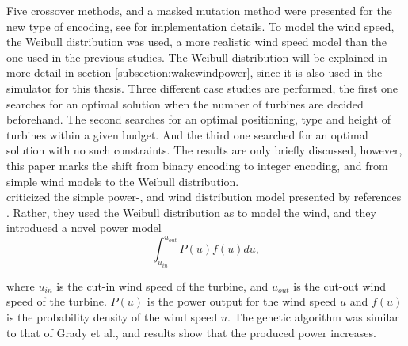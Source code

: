 \noindent Five crossover methods, and a masked mutation method were presented for the new type of encoding, see \cite{Mora} for implementation details. To model the wind speed, the Weibull distribution was used, a more realistic wind speed model than the one used in the previous studies. The Weibull distribution will be explained in more detail in section \ref{subsection:wakewindpower}, since it is also used in the simulator for this thesis. Three different case studies are performed, the first one searches for an optimal solution when the number of turbines are decided beforehand. The second searches for an optimal positioning, type and height of turbines within a given budget. And the third one searched for an optimal solution with no such constraints. The results are only briefly discussed, however, this paper marks the shift from binary encoding to integer encoding, and from simple wind models to the Weibull distribution.\\


\noindent \cite{Wan} criticized the simple power-, and wind distribution model presented by references \citep{Mosetti, Grady}. Rather, they used the Weibull distribution as \citep{Mora} to model the wind, and they introduced a novel power model \\


\begin{equation}
\label{Power Model (Wan)}
\int_{u_{in}}^{u_{out}} P(u)f(u) du,
\end{equation}


\noindent where $u_{in}$ is the cut-in wind speed of the turbine, and $u_{out}$ is the cut-out wind speed of the turbine. $P(u)$ is the power output for the wind speed $u$ and $f(u)$ is the probability density of the wind speed $u$. The genetic algorithm was similar to that of Grady et al., and results show that the produced power increases.\\


